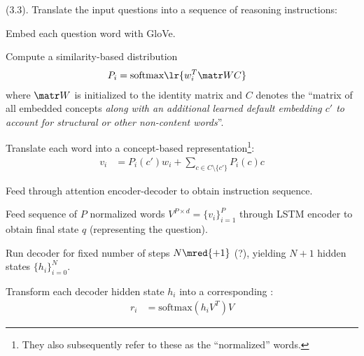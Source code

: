 \documentclass[11pt]{article}
\begin{document}
 (3.3). Translate the input questions into a sequence of reasoning instructions:
\begin{compactenum}
	\item Embed each question word with GloVe. 
	
	\item Compute a similarity-based distribution
	\begin{align}
	P_i &= \text{softmax}\lr{ w_i^T \matr W C }
	\end{align}
	where $\matr W$ is initialized to the identity matrix and $C$ denotes the ``matrix of all embedded concepts \emph{along with an additional learned default embedding $c'$ to account for structural or other non-content words}''.
	
	\item Translate each word into a concept-based representation\footnote{They also subsequently refer to these as the ``normalized'' words.}:
	\begin{align}
	v_i &= P_i(c') w_i  + \sum_{c \in C \setminus \{c'\}} P_i(c) c
	\end{align}
	
	
	\item Feed through attention encoder-decoder to obtain instruction sequence. 
	\begin{compactenum}
		\item Feed sequence of $P$ normalized words $V^{P \times d} = \{v_i\}_{i=1}^{P}$ through LSTM encoder to obtain final state $q$ (representing the question). 
		
		\item Run decoder for fixed number of steps $N\mred{+1}$ (?), yielding $N+1$ hidden states $\{h_i\}_{i=0}^{N}$. 
		
		\item Transform each decoder hidden state $h_i$ into a corresponding :
		\begin{align}
		r_i &= \text{softmax}(h_i V^T) V
		\end{align}
	\end{compactenum}
\end{compactenum}
\end{document}
